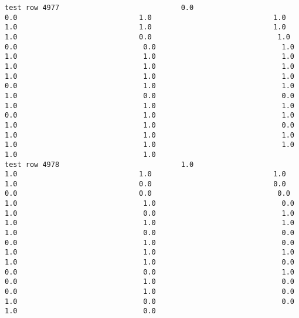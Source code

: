 \documentclass[11pt]{article}
\begin{document}
\begin{verbatim}
test row 4977                             0.0                             0.0                             1.0                             1.0                             1.0                             1.0                             1.0                             1.0                             0.0                              1.0                              0.0                              0.0                              1.0                              1.0                              1.0                              1.0                              1.0                              1.0                              1.0                              1.0                              1.0                              1.0                              0.0                              1.0                              1.0                              1.0                              0.0                              0.0                              1.0                              1.0                              1.0                              0.0                              1.0                              1.0                              1.0                              1.0                              0.0                              1.0                              1.0                              1.0                              1.0                              1.0                              1.0                              1.0                              1.0
test row 4978                             1.0                             1.0                             1.0                             1.0                             1.0                             0.0                             0.0                             0.0                             0.0                              0.0                              1.0                              1.0                              0.0                              1.0                              0.0                              1.0                              1.0                              1.0                              1.0                              1.0                              0.0                              0.0                              0.0                              1.0                              0.0                              1.0                              1.0                              1.0                              1.0                              1.0                              0.0                              0.0                              0.0                              1.0                              0.0                              1.0                              0.0                              0.0                              1.0                              0.0                              1.0                              0.0                              0.0                              1.0                              0.0

\end{verbatim}
\end{document}
